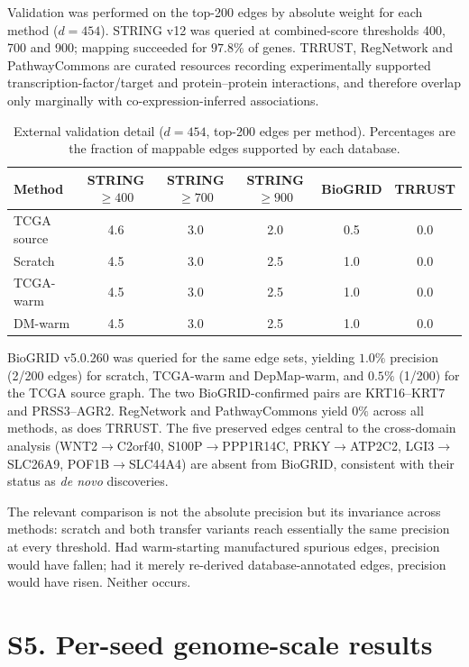 \documentclass[11pt]{article}
\renewcommand{\to}{\ensuremath{\rightarrow}\allowbreak}
\begin{document}
Validation was performed on the top-200 edges by absolute weight for each method
($d=454$). STRING v12 was queried at combined-score thresholds 400, 700 and 900; mapping
succeeded for $97.8\%$ of genes. TRRUST, RegNetwork and PathwayCommons are curated
resources recording experimentally supported transcription-factor/target and
protein--protein interactions, and therefore overlap only marginally with
co-expression-inferred associations.

\setcounter{table}{3}
\begin{table}[h]
\caption{External validation detail ($d=454$, top-200 edges per method). Percentages
are the fraction of mappable edges supported by each database.}
\begin{tabular}{@{}lccccc@{}}
\toprule
Method & STRING $\ge400$ & STRING $\ge700$ & STRING $\ge900$ & BioGRID & TRRUST\\
\midrule
TCGA source & 4.6 & 3.0 & 2.0 & 0.5 & 0.0\\
Scratch     & 4.5 & 3.0 & 2.5 & 1.0 & 0.0\\
TCGA-warm   & 4.5 & 3.0 & 2.5 & 1.0 & 0.0\\
DM-warm     & 4.5 & 3.0 & 2.5 & 1.0 & 0.0\\
\bottomrule
\end{tabular}
\label{tab:Sstring}
\end{table}

BioGRID v5.0.260 was queried for the same edge sets, yielding $1.0\%$ precision
(2/200 edges) for scratch, TCGA-warm and DepMap-warm, and $0.5\%$ (1/200) for the TCGA
source graph. The two BioGRID-confirmed pairs are KRT16--KRT7 and PRSS3--AGR2. RegNetwork
and PathwayCommons yield $0\%$ across all methods, as does TRRUST. The five preserved
edges central to the cross-domain analysis (WNT2\to C2orf40, S100P\to PPP1R14C,
PRKY\to ATP2C2, LGI3\to SLC26A9, POF1B\to SLC44A4) are absent from BioGRID, consistent
with their status as \emph{de novo} discoveries.

The relevant comparison is not the absolute precision but its invariance across methods:
scratch and both transfer variants reach essentially the same precision at every
threshold. Had warm-starting manufactured spurious edges, precision would have fallen;
had it merely re-derived database-annotated edges, precision would have risen. Neither
occurs.

\section*{S5. Per-seed genome-scale results}
\end{document}
